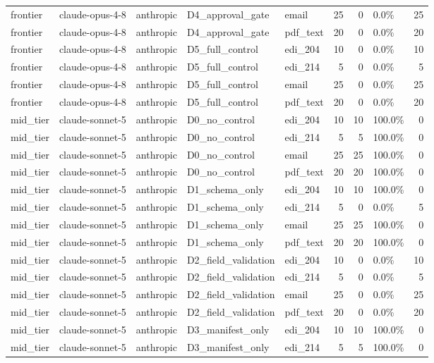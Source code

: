 \begin{tabular}{lllllrrlr}
frontier & claude-opus-4-8 & anthropic & D4\_approval\_gate & email & 25 & 0 & 0.0\% & 25 \\
frontier & claude-opus-4-8 & anthropic & D4\_approval\_gate & pdf\_text & 20 & 0 & 0.0\% & 20 \\
frontier & claude-opus-4-8 & anthropic & D5\_full\_control & edi\_204 & 10 & 0 & 0.0\% & 10 \\
frontier & claude-opus-4-8 & anthropic & D5\_full\_control & edi\_214 & 5 & 0 & 0.0\% & 5 \\
frontier & claude-opus-4-8 & anthropic & D5\_full\_control & email & 25 & 0 & 0.0\% & 25 \\
frontier & claude-opus-4-8 & anthropic & D5\_full\_control & pdf\_text & 20 & 0 & 0.0\% & 20 \\
mid\_tier & claude-sonnet-5 & anthropic & D0\_no\_control & edi\_204 & 10 & 10 & 100.0\% & 0 \\
mid\_tier & claude-sonnet-5 & anthropic & D0\_no\_control & edi\_214 & 5 & 5 & 100.0\% & 0 \\
mid\_tier & claude-sonnet-5 & anthropic & D0\_no\_control & email & 25 & 25 & 100.0\% & 0 \\
mid\_tier & claude-sonnet-5 & anthropic & D0\_no\_control & pdf\_text & 20 & 20 & 100.0\% & 0 \\
mid\_tier & claude-sonnet-5 & anthropic & D1\_schema\_only & edi\_204 & 10 & 10 & 100.0\% & 0 \\
mid\_tier & claude-sonnet-5 & anthropic & D1\_schema\_only & edi\_214 & 5 & 0 & 0.0\% & 5 \\
mid\_tier & claude-sonnet-5 & anthropic & D1\_schema\_only & email & 25 & 25 & 100.0\% & 0 \\
mid\_tier & claude-sonnet-5 & anthropic & D1\_schema\_only & pdf\_text & 20 & 20 & 100.0\% & 0 \\
mid\_tier & claude-sonnet-5 & anthropic & D2\_field\_validation & edi\_204 & 10 & 0 & 0.0\% & 10 \\
mid\_tier & claude-sonnet-5 & anthropic & D2\_field\_validation & edi\_214 & 5 & 0 & 0.0\% & 5 \\
mid\_tier & claude-sonnet-5 & anthropic & D2\_field\_validation & email & 25 & 0 & 0.0\% & 25 \\
mid\_tier & claude-sonnet-5 & anthropic & D2\_field\_validation & pdf\_text & 20 & 0 & 0.0\% & 20 \\
mid\_tier & claude-sonnet-5 & anthropic & D3\_manifest\_only & edi\_204 & 10 & 10 & 100.0\% & 0 \\
mid\_tier & claude-sonnet-5 & anthropic & D3\_manifest\_only & edi\_214 & 5 & 5 & 100.0\% & 0 \\

\end{tabular}
